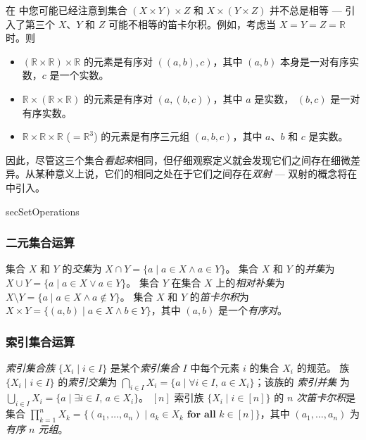\begin{example}
在  中您可能已经注意到集合 $(X \times Y) \times Z$ 和 $X \times (Y \times Z)$ 并不总是相等 ---  引入了第三个 $X$、$Y$ 和 $Z$ 可能不相等的笛卡尔积。例如，考虑当 $X=Y=Z=\mathbb{R}$ 时。则
\begin{itemize}
\item $(\mathbb{R} \times \mathbb{R}) \times \mathbb{R}$ 的元素是有序对 $((a,b),c)$，其中 $(a,b)$ 本身是一对有序实数，$c$ 是一个实数。
\item $\mathbb{R} \times (\mathbb{R} \times \mathbb{R})$ 的元素是有序对 $(a,(b,c))$，其中 $a$ 是实数， $(b,c)$ 是一对有序实数。
\item $\mathbb{R} \times \mathbb{R} \times \mathbb{R}$ ($=\mathbb{R}^3$) 的元素是有序三元组 $(a,b,c)$，其中 $a$、$b$ 和 $c$ 是实数。
\end{itemize}
因此，尽管这三个集合\textit{看起来}相同，但仔细观察定义就会发现它们之间存在细微差异。从某种意义上说，它们的相同之处在于它们之间存在\textit{双射} --- 双射的概念将在中引入。
\end{example}

\begin{tldr}{secSetOperations}

\subsubsection*{二元集合运算}

\begin{tldrlist}
 集合 $X$ 和 $Y$ 的\textit{交集}为 $X \cap Y = \{ a \mid a \in X \wedge a \in Y \}$。
 集合 $X$ 和 $Y$ 的\textit{并集}为 $X \cup Y = \{ a \mid a \in X \vee a \in Y \}$。
 集合 $Y$ 在集合 $X$ 上的\textit{相对补集}为 $X \setminus Y = \{ a \mid a \in X \wedge a \not\in Y \}$。
 集合 $X$ 和 $Y$ 的\textit{笛卡尔积}为 $X \times Y = \{ (a,b) \mid a \in X \wedge b \in Y \}$，其中 $(a,b)$ 是一个\textit{有序对}。
\end{tldrlist}

\subsubsection*{索引集合运算}

\begin{tldrlist}
 \textit{索引集合族} $\{ X_i \mid i \in I \}$ 是某个\textit{索引集合} $I$ 中每个元素 $i$ 的集合 $X_i$ 的规范。
 族 $\{ X_i \mid i \in I \}$ 的\textit{索引交集}为 $\bigcap_{i \in I} X_i = \{ a \mid \forall i \in I,\, a \in X_i \}$；该族的 \textit{索引并集} 为 $\bigcup_{i \in I} X_i = \{ a \mid \exists i \in I,\, a \in X_i \}$。
 $[n]$ 索引族 $\{ X_i \mid i \in [n] \}$ 的 \textit{$n$ 次笛卡尔积}是集合   $\prod_{k=1}^n X_k = \{ (a_1, \dots, a_n) \mid a_k \in X_k \textbf{ for all } k \in [n] \}$，其中 $(a_1, \dots, a_n)$ 为 \textit{有序 $n$ 元组}。
\end{tldrlist}

\end{tldr}

